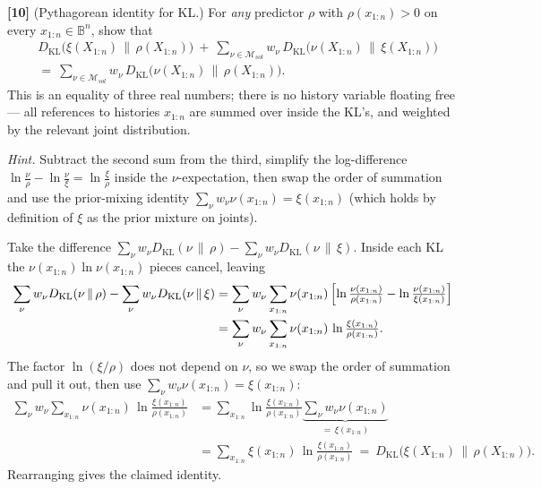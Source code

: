 \documentclass[fontsize=11pt, parskip=half]{scrartcl}
\theoremstyle{definition}
\newenvironment{solution}{%
    \begin{tcolorbox}[colback=black!5!white, colframe=black!50!white,
      title={\textbf{Solution}}, fonttitle=\normalfont, breakable]
  }{\end{tcolorbox}}
\newenvironment{solution}{\expandafter\comment}{\expandafter\endcomment}
\newcommand{\Msol}{\mathcal{M}_{sol}}
\newcommand{\KL}{D_{\text{KL}}}
\begin{document}
\bigskip

\noindent
\textbf{[10]} (Pythagorean identity for KL.) For \emph{any} predictor $\rho$
with $\rho(x_{1:n}) > 0$ on every $x_{1:n} \in \mathbb{B}^n$, show that
\begin{align*}
  &\KL\bigl(\xi(X_{1:n}) \,\big\|\, \rho(X_{1:n})\bigr)
  ~+~
  \sum_{\nu \in \Msol} w_\nu \, \KL\bigl(\nu(X_{1:n}) \,\big\|\, \xi(X_{1:n})\bigr) \\
  &=~
  \sum_{\nu \in \Msol} w_\nu \, \KL\bigl(\nu(X_{1:n}) \,\big\|\, \rho(X_{1:n})\bigr).
\end{align*}
This is an equality of three real numbers; there is no history variable
floating free --- all references to histories $x_{1:n}$ are summed over inside
the KL's, and weighted by the relevant joint distribution.

\textit{Hint.} Subtract the second sum from the third, simplify the
log-difference $\ln\tfrac{\nu}{\rho} - \ln\tfrac{\nu}{\xi} = \ln\tfrac{\xi}{\rho}$
inside the $\nu$-expectation, then swap the order of summation and use the
prior-mixing identity $\sum_\nu w_\nu \nu(x_{1:n}) = \xi(x_{1:n})$ (which holds
by definition of $\xi$ as the prior mixture on joints).

\begin{solution}
Take the difference $\sum_\nu w_\nu \KL(\nu \,\|\, \rho) - \sum_\nu w_\nu
\KL(\nu \,\|\, \xi)$. Inside each KL the $\nu(x_{1:n}) \ln \nu(x_{1:n})$ pieces
cancel, leaving
\begin{align*}
\sum_\nu w_\nu \KL(\nu \,\|\, \rho) - \sum_\nu w_\nu \KL(\nu \,\|\, \xi)
&= \sum_\nu w_\nu \sum_{x_{1:n}}
   \nu(x_{1:n})\,\Bigl[\ln\tfrac{\nu(x_{1:n})}{\rho(x_{1:n})}
                  - \ln\tfrac{\nu(x_{1:n})}{\xi(x_{1:n})}\Bigr] \\
&= \sum_\nu w_\nu \sum_{x_{1:n}}
   \nu(x_{1:n})\,\ln \tfrac{\xi(x_{1:n})}{\rho(x_{1:n})}.
\end{align*}
The factor $\ln(\xi/\rho)$ does not depend on $\nu$, so we swap the order of
summation and pull it out, then use $\sum_\nu w_\nu \nu(x_{1:n}) = \xi(x_{1:n})$:
\begin{align*}
\sum_\nu w_\nu \sum_{x_{1:n}}
   \nu(x_{1:n})\,\ln \tfrac{\xi(x_{1:n})}{\rho(x_{1:n})}
&= \sum_{x_{1:n}} \ln \tfrac{\xi(x_{1:n})}{\rho(x_{1:n})}
   \underbrace{\sum_\nu w_\nu \nu(x_{1:n})}_{=\, \xi(x_{1:n})} \\
&= \sum_{x_{1:n}} \xi(x_{1:n}) \,\ln \tfrac{\xi(x_{1:n})}{\rho(x_{1:n})}
~=~ \KL\bigl(\xi(X_{1:n}) \,\big\|\, \rho(X_{1:n})\bigr).
\end{align*}
Rearranging gives the claimed identity. \qedhere
\end{solution}
\end{document}
